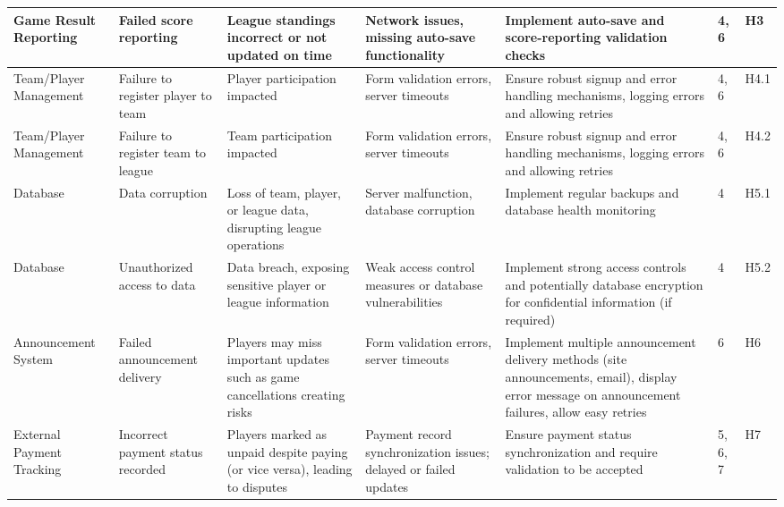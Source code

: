 \documentclass{article}
\begin{document}
\begin{landscape}
\begin{table}[hp]
\begin{footnotesize}
\begin{tabular}{|p{1in}|p{1in}|p{1in}|p{1.5in}|p{2.5in}|p{0.2in}|p{0.2in}|}
        \hline
        Game Result Reporting & Failed score reporting & League standings incorrect or not updated on time & Network issues, missing auto-save functionality & Implement auto-save and score-reporting validation checks & 4, 6 & H3 \\
        \hline
        Team/Player Management & Failure to register player to team & Player participation impacted & Form validation errors, server timeouts & Ensure robust signup and error handling mechanisms, logging errors and allowing retries & 4, 6 & H4.1 \\
        \hline
        Team/Player Management & Failure to register team to league & Team participation impacted & Form validation errors, server timeouts & Ensure robust signup and error handling mechanisms, logging errors and allowing retries & 4, 6 & H4.2 \\
        \hline
        Database & Data corruption & Loss of team, player, or league data, disrupting league operations & Server malfunction, database corruption & Implement regular backups and database health monitoring & 4 & H5.1 \\
        \hline

        Database & Unauthorized access to data & Data breach, exposing sensitive player or league information & Weak access control measures or database vulnerabilities  & Implement strong access controls and potentially database encryption for confidential information (if required) & 4 & H5.2 \\
        \hline

        Announcement System & Failed announcement delivery & Players may miss important updates such as game cancellations creating risks & Form validation errors, server timeouts & Implement multiple announcement delivery methods (site announcements, email), display error message on announcement failures, allow easy retries  & 6 & H6 \\
        \hline
      
        External Payment Tracking & Incorrect payment status recorded & Players marked as unpaid despite paying (or vice versa), leading to disputes & Payment record synchronization issues; delayed or failed updates & Ensure payment status synchronization and require validation to be accepted & 5, 6, 7& H7 \\
        \hline
        

\end{tabular}
\end{footnotesize}
\end{table}
\end{landscape}
\end{document}
